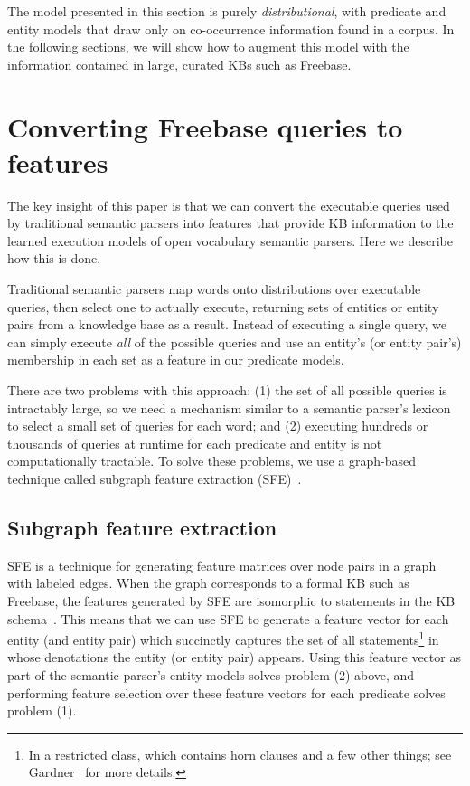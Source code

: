 \documentclass[11pt,letterpaper]{article}
\begin{document}
The model presented in this section is purely \emph{distributional}, with
predicate and entity models that draw only on co-occurrence information found
in a corpus.  In the following sections, we will show how to augment this model
with the information contained in large, curated KBs such as Freebase.

\section{Converting Freebase queries to features}
\label{sec:queries-as-features}

The key insight of this paper is that we can convert the executable queries
used by traditional semantic parsers into features that provide KB information
to the learned execution models of open vocabulary semantic parsers.  Here we
describe how this is done.

Traditional semantic parsers map words onto distributions over executable
queries, then select one to actually execute, returning sets of entities or
entity pairs from a knowledge base as a result.  Instead of executing a single
query, we can simply execute \emph{all} of the possible queries and use an
entity's (or entity pair's) membership in each set as a feature in our
predicate models.

There are two problems with this approach: (1) the set of all possible queries
is intractably large, so we need a mechanism similar to a semantic parser's
lexicon to select a small set of queries for each word; and (2) executing
hundreds or thousands of queries at runtime for each predicate and entity is
not computationally tractable.  To solve these problems, we use a graph-based
technique called subgraph feature extraction (SFE)~\cite{gardner-2015-sfe}.

\subsection{Subgraph feature extraction}

SFE is a technique for generating feature matrices over node pairs in a graph
with labeled edges.  When the graph corresponds to a formal KB such as
Freebase, the features generated by SFE are isomorphic to statements in the KB
schema~\cite{gardner-2015-thesis}.  This means that we can use SFE to generate
a feature vector for each entity (and entity pair) which succinctly captures
the set of all statements\footnote{In a restricted class, which contains horn
clauses and a few other things; see Gardner~ for
more details.} in whose denotations the entity (or entity pair) appears.  Using
this feature vector as part of the semantic parser's entity models solves
problem (2) above, and performing feature selection over these feature vectors
for each predicate solves problem (1).
\end{document}
